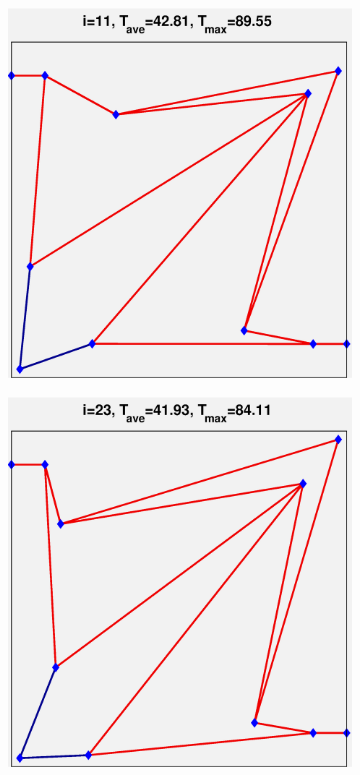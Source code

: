 \documentclass[11pt,letterpaper]{article}
\begin{document}
\begin{figure}[!h]
\begin{subfigure}{0.2\textwidth}
\caption{}
\end{subfigure}
\begin{subfigure}{0.2\textwidth}
\includegraphics[width=\linewidth]{parallel2x2_channel_11.eps}
\caption{}
\end{subfigure}
\begin{subfigure}{0.2\textwidth}
\includegraphics[width=\linewidth]{parallel2x2_channel_23.eps}
\caption{}
\end{subfigure}


\end{figure}
\end{document}
